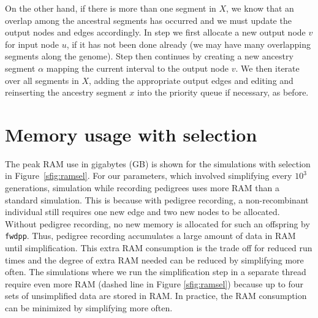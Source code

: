 \documentclass{article}
\newcommand{\fwdpp}{\texttt{fwdpp}}
\newcommand{\krt}[1]{{\em \color{green} #1}}
\begin{document}
On the other hand, if there is more than one segment in $X$, we know that an
overlap among the ancestral segments has occurred and we must update the output
nodes and edges accordingly. In step  we first allocate a new output
node $v$ for input node $u$, if it has not been done already (we may have many overlapping
segments along the genome). Step  then continues by creating a new
ancestry segment $\alpha$ mapping the current interval to the output node $v$.
We then iterate over all segments in $X$, adding the appropriate output edges
and editing and reinserting the ancestry segment $x$ into the priority queue if
necessary, as before.


\section{Memory usage with selection}
\label{ss:memuse}
\renewcommand{\thefigure}{B\arabic{figure}}
\setcounter{figure}{0}

The peak RAM use in gigabytes (GB) is shown for the simulations with selection in Figure~\ref{sfig:ramsel}.  For our parameters, which involved simplifying every
$10^3$ generations, simulation while recording pedigrees uses more RAM than a standard simulation.
This is because with pedigree recording, a non-recombinant
individual still requires one new edge and two new nodes to be allocated.  Without pedigree recording, no new memory is allocated for such an offspring by \fwdpp{}.
Thus, pedigree recording accumulates a large amount of data in RAM until
simplification.  This extra RAM consumption is the trade off for reduced run times and the degree of extra RAM needed
can be reduced by simplifying more often.  The simulations where we run the simplification step in a separate thread
require even more RAM (dashed line in Figure \ref{sfig:ramsel}) because up to four sets of unsimplified data are
stored in RAM.  In practice, the RAM consumption can be minimized by simplifying more often.

\end{document}
